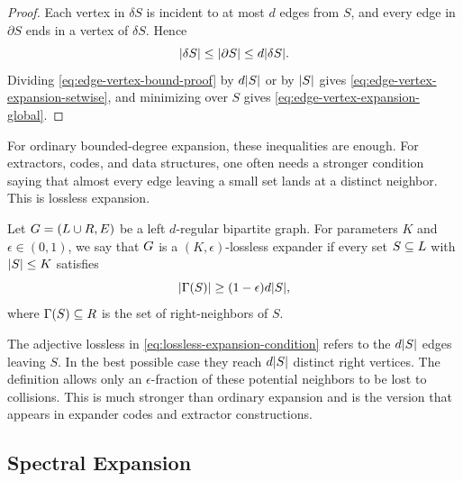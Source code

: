 \begin{proof}
	Each vertex in \(\delta S\) is incident to at most \(d\) edges from \(S\), and every edge in \(\partial S\) ends in a vertex of \(\delta S\). Hence
	\begin{equation}
		\label{eq:edge-vertex-bound-proof}
		\lvert\delta S\rvert\leq \lvert\partial S\rvert\leq d\lvert\delta S\rvert.
	\end{equation}
	Dividing \cref{eq:edge-vertex-bound-proof} by \(d\lvert S\rvert\) or by \(\lvert S\rvert\) gives \cref{eq:edge-vertex-expansion-setwise}, and minimizing over \(S\) gives \cref{eq:edge-vertex-expansion-global}.
\end{proof}

For ordinary bounded-degree expansion, these inequalities are enough. For extractors, codes, and data structures, one often needs a stronger condition saying that almost every edge leaving a small set lands at a distinct neighbor. This is lossless expansion.

\begin{definition}
	\label{def:lossless-expander}
	Let \(G=(L\cup R,E)\) be a left \(d\)-regular bipartite graph. For parameters \(K\) and \(\epsilon\in(0,1)\), we say that \(G\) is a \((K,\epsilon)\)-lossless expander if every set \(S\subseteq L\) with \(\lvert S\rvert\leq K\) satisfies
	\begin{equation}
		\label{eq:lossless-expansion-condition}
		\lvert\Gamma(S)\rvert\geq (1-\epsilon)d\lvert S\rvert,
	\end{equation}
	where \(\Gamma(S)\subseteq R\) is the set of right-neighbors of \(S\).
\end{definition}

The adjective lossless in \cref{eq:lossless-expansion-condition} refers to the \(d\lvert S\rvert\) edges leaving \(S\). In the best possible case they reach \(d\lvert S\rvert\) distinct right vertices. The definition allows only an \(\epsilon\)-fraction of these potential neighbors to be lost to collisions. This is much stronger than ordinary expansion and is the version that appears in expander codes and extractor constructions.

\subsection{Spectral Expansion}
\label{subsec:spectral-expansion-preview}

